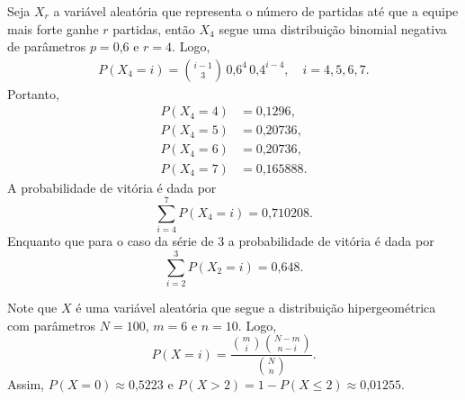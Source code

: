 \begin{questions}
\setcounter{question}{71}
\begin{solution}
	Seja $X_r$ a variável aleatória que representa o número de partidas até que a equipe mais forte ganhe $r$ partidas, então $X_4$ segue uma distribuição binomial negativa de parâmetros $p=\text{0,6}$ e $r=4$. Logo,
    \begin{align*}
    	P(X_4 = i) = \binom{i-1}{3}\,\text{0,6}^4\,\text{0,4}^{i-4},
        	\quad i=4,5,6,7.
    \end{align*}
    Portanto,
    \begin{align*}
    	P(X_4 = 4) &= \text{0,1296},\\
        P(X_4 = 5) &= \text{0,20736},\\
        P(X_4 = 6) &= \text{0,20736},\\
        P(X_4 = 7) &= \text{0,165888}.
    \end{align*}
    A probabilidade de vitória é dada por \[\sum_{i=4}^7 P(X_4 = i) = \text{0,710208}.\] Enquanto que para o caso da série de 3 a probabilidade de vitória é dada por \[\sum_{i=2}^3 P(X_2 = i) = \text{0,648}.\]
\end{solution}

\setcounter{question}{78}
\begin{solution}
	Note que $X$ é uma variável aleatória que segue a distribuição hipergeométrica com parâmetros $N=100$, $m=6$ e $n=10$. Logo,
    \begin{equation*}
    	P(X=i) = \frac{\binom{m}{i}\binom{N-m}{n-i}}{\binom{N}{n}}.
    \end{equation*}
    Assim, $P(X=0) \approx \text{0,5223}$ e $P(X>2)=1-P(X\le2)\approx \text{0,01255}$.
\end{solution}


\end{questions}

